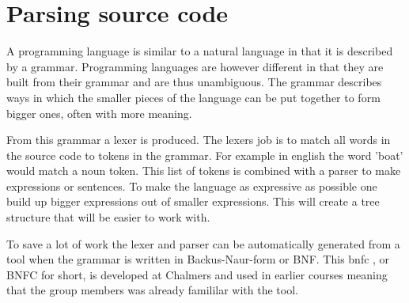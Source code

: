 \section{Parsing source code} \label{sec:bnfc}



A programming language is similar to a natural language in that it is described by a grammar. Programming languages are however different in that they are built from their grammar and are thus unambiguous. %
The grammar describes ways in which the smaller pieces of the language can be put together to form bigger ones, often with more meaning. 

From this grammar a lexer is produced. The lexers job is to match all words in the source code to tokens in the grammar. For example in english the word 'boat' would match a noun token. This list of tokens is combined with a parser to make expressions or sentences. To make the language as expressive as possible one build up bigger expressions out of smaller expressions. This will create a tree structure that will be easier to work with. 

To save a lot of work the lexer and parser can be automatically generated from a tool when the grammar is written in Backus-Naur-form or BNF. This \gls{bnfc} \cite{bnfc}, or BNFC for short, is developed at Chalmers and used in earlier courses meaning that the group members was already famililar with the tool.



